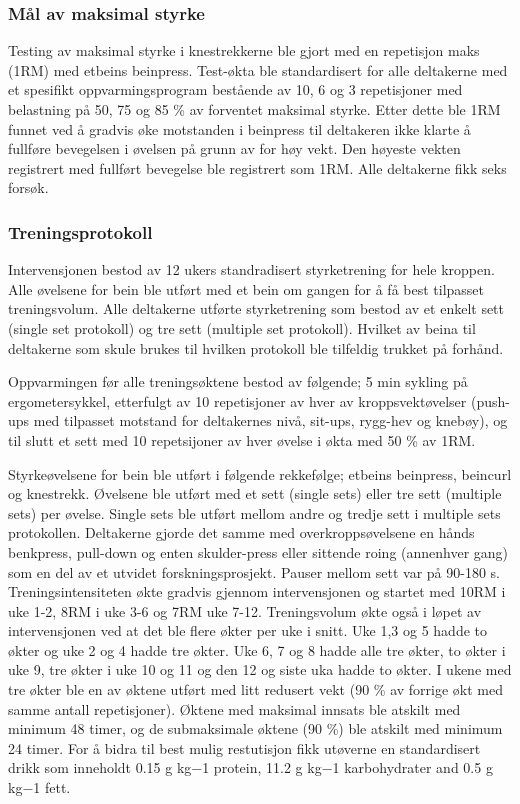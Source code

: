 \documentclass[
  letterpaper,
  DIV=11,
  numbers=noendperiod]{scrreprt}
\begin{document}
\subsubsection{Mål av maksimal styrke}\label{muxe5l-av-maksimal-styrke}

Testing av maksimal styrke i knestrekkerne ble gjort med en repetisjon
maks (1RM) med etbeins beinpress. Test-økta ble standardisert for alle
deltakerne med et spesifikt oppvarmingsprogram bestående av 10, 6 og 3
repetisjoner med belastning på 50, 75 og 85 \% av forventet maksimal
styrke. Etter dette ble 1RM funnet ved å gradvis øke motstanden i
beinpress til deltakeren ikke klarte å fullføre bevegelsen i øvelsen på
grunn av for høy vekt. Den høyeste vekten registrert med fullført
bevegelse ble registrert som 1RM. Alle deltakerne fikk seks forsøk.

\subsubsection{Treningsprotokoll}\label{treningsprotokoll}

Intervensjonen bestod av 12 ukers standradisert styrketrening for hele
kroppen. Alle øvelsene for bein ble utført med et bein om gangen for å
få best tilpasset treningsvolum. Alle deltakerne utførte styrketrening
som bestod av et enkelt sett (single set protokoll) og tre sett
(multiple set protokoll). Hvilket av beina til deltakerne som skule
brukes til hvilken protokoll ble tilfeldig trukket på forhånd.

Oppvarmingen før alle treningsøktene bestod av følgende; 5 min sykling
på ergometersykkel, etterfulgt av 10 repetisjoner av hver av
kroppsvektøvelser (push-ups med tilpasset motstand for deltakernes nivå,
sit-ups, rygg-hev og knebøy), og til slutt et sett med 10 repetsijoner
av hver øvelse i økta med 50 \% av 1RM.

Styrkeøvelsene for bein ble utført i følgende rekkefølge; etbeins
beinpress, beincurl og knestrekk. Øvelsene ble utført med et sett
(single sets) eller tre sett (multiple sets) per øvelse. Single sets ble
utført mellom andre og tredje sett i multiple sets protokollen.
Deltakerne gjorde det samme med overkroppsøvelsene en hånds benkpress,
pull-down og enten skulder-press eller sittende roing (annenhver gang)
som en del av et utvidet forskningsprosjekt. Pauser mellom sett var på
90-180 s. Treningsintensiteten økte gradvis gjennom intervensjonen og
startet med 10RM i uke 1-2, 8RM i uke 3-6 og 7RM uke 7-12. Treningsvolum
økte også i løpet av intervensjonen ved at det ble flere økter per uke i
snitt. Uke 1,3 og 5 hadde to økter og uke 2 og 4 hadde tre økter. Uke 6,
7 og 8 hadde alle tre økter, to økter i uke 9, tre økter i uke 10 og 11
og den 12 og siste uka hadde to økter. I ukene med tre økter ble en av
øktene utført med litt redusert vekt (90 \% av forrige økt med samme
antall repetisjoner). Øktene med maksimal innsats ble atskilt med
minimum 48 timer, og de submaksimale øktene (90 \%) ble atskilt med
minimum 24 timer. For å bidra til best mulig restutisjon fikk utøverne
en standardisert drikk som inneholdt 0.15 g kg−1 protein, 11.2 g kg−1
karbohydrater and 0.5 g kg−1 fett.
\end{document}
